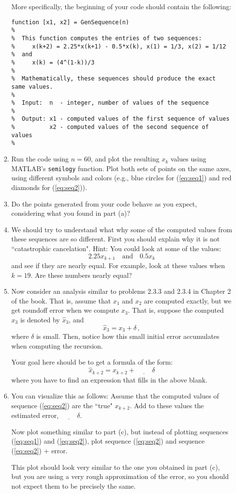 \documentclass[12pt]{article}
\begin{document}
\begin{enumerate}
\begin{enumerate}
More specifically, the beginning of your code should contain the following:
{\footnotesize
\begin{verbatim}
function [x1, x2] = GenSequence(n)
%
%  This function computes the entries of two sequences:
%     x(k+2) = 2.25*x(k+1) - 0.5*x(k), x(1) = 1/3, x(2) = 1/12
%  and 
%     x(k) = (4^(1-k))/3
%
%  Mathematically, these sequences should produce the exact same values.
%
%  Input:  n  - integer, number of values of the sequence
%
%  Output: x1 - computed values of the first sequence of values
%          x2 - computed values of the second sequence of values
%
\end{verbatim}
}
\item
Run the code using $n = 60$, and plot the resulting $x_k$ values 
using MATLAB's {\tt semilogy} function.  Plot both sets of points on the
same axes, using different symbols and colors (e.g., blue circles for (\ref{eq:seq1})
and red diamonds for (\ref{eq:seq2})).
\item
Do the points generated from your code behave as you expect, considering what
you found in part (a)?  
\item
We should try to understand what why some of the computed values from these sequences are so different.
First you should explain why it is not ``catastrophic cancelation".
Hint: 
You could
look at some of the values:
$$
   2.25x_{k+1} \quad \mbox{and} \quad 0.5x_k
$$
and see if they are nearly equal.  For example, look at these values when $k=19$. Are these numbers nearly equal?
\item
Now consider an analysis similar to 
problems 2.3.3 and 2.3.4 in Chapter 2 of the book.  That is,
assume that $x_1$ and $x_2$ are computed exactly, but
we get roundoff error when we compute $x_3$.  That is, suppose
the computed $x_3$ is denoted by $\hat{x}_3$, and
$$
  \hat{x}_3 = x_3 + \delta\,,
$$
where $\delta$ is small.  Then, notice how this small initial error accumulates when computing
the recursion.

Your goal here should be to get a formula of the form:
$$
\hat{x}_{k+2} = x_{k+2} + \underline{\hspace{1cm}}\delta
$$
where you have to find an expression that fills in the above blank.
\item
You can visualize this as follows: Assume that the computed values of sequence (\ref{eq:seq2})
are the ``true" $x_{k+2}$.  Add to these values the estimated error,
$\underline{\hspace{1cm}}\delta$.

Now plot something similar to part (c), but instead of plotting sequences (\ref{eq:seq1})
and (\ref{eq:seq2}), plot sequence (\ref{eq:seq2}) and sequence (\ref{eq:seq2}) + error. 

This plot should look very similar to the one you obtained in part (c),  but you are using a
very rough approximation of the error, so you should not expect them to be precisely the 
same.
\end{enumerate}
\end{enumerate}
\end{document}
